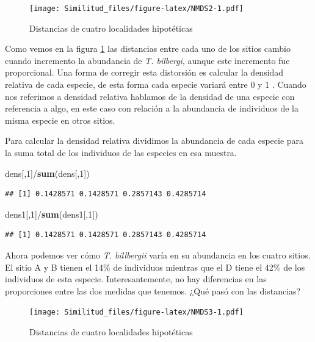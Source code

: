 \documentclass[]{book}
\newenvironment{Shaded}{\begin{snugshade}}{\end{snugshade}}
\newcommand{\KeywordTok}[1]{\textcolor[rgb]{0.13,0.29,0.53}{\textbf{{#1}}}}
\newcommand{\DecValTok}[1]{\textcolor[rgb]{0.00,0.00,0.81}{{#1}}}
\newcommand{\NormalTok}[1]{{#1}}
\begin{document}
\begin{figure}[htbp]
\centering
\texttt{[image: Similitud\_files/figure-latex/NMDS2-1.pdf]}
\caption{\label{fig:NMDS2}Distancias de cuatro localidades hipotéticas}
\end{figure}

Como vemos en la figura \ref{fig:NMDS2} las distancias entre cada uno de
los sitios cambio cuando incremento la abundancia de \emph{T. bilbergi},
aunque este incremento fue proporcional. Una forma de corregir esta
distorsión es calcular la densidad relativa de cada especie, de esta
forma cada especie variará entre 0 y 1 \citep{Stevens2009}. Cuando nos
referimos a densidad relativa hablamos de la densidad de una especie con
referencia a algo, en este caso con relación a la abundancia de
individuos de la misma especie en otros sitios.

Para calcular la densidad relativa dividimos la abundancia de cada
especie para la suma total de los individuos de las especies en esa
muestra.

\begin{Shaded}
\begin{Highlighting}[]
\NormalTok{dens[,}\DecValTok{1}\NormalTok{]/}\KeywordTok{sum}\NormalTok{(dens[,}\DecValTok{1}\NormalTok{])}
\end{Highlighting}
\end{Shaded}

\begin{verbatim}
## [1] 0.1428571 0.1428571 0.2857143 0.4285714
\end{verbatim}

\begin{Shaded}
\begin{Highlighting}[]
\NormalTok{dens1[,}\DecValTok{1}\NormalTok{]/}\KeywordTok{sum}\NormalTok{(dens1[,}\DecValTok{1}\NormalTok{])}
\end{Highlighting}
\end{Shaded}

\begin{verbatim}
## [1] 0.1428571 0.1428571 0.2857143 0.4285714
\end{verbatim}

Ahora podemos ver cómo \emph{T. billbergii} varía en su abundancia en
los cuatro sitios. El sitio A y B tienen el 14\% de individuos mientras
que el D tiene el 42\% de los individuos de esta especie.
Interesantemente, no hay diferencias en las proporciones entre las dos
medidas que tenemos. ¿Qué pasó con las distancias?

\begin{figure}[htbp]
\centering
\texttt{[image: Similitud\_files/figure-latex/NMDS3-1.pdf]}
\caption{\label{fig:NMDS3}Distancias de cuatro localidades hipotéticas}
\end{figure}
\end{document}
